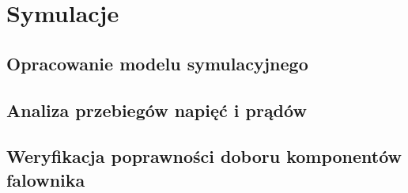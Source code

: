 \chapter{Symulacje}
\label{chap: Symulacje}

\section{Opracowanie modelu symulacyjnego}
\label{sec: Opracowanie modelu symulacyjnego}

\section{Analiza przebiegów napięć i prądów}
\label{sec: Analiza przebiegów napięć i prądów}

\section{Weryfikacja poprawności doboru komponentów falownika}
\label{sec: Weryfikacja poprawności doboru komponentów falownika}
